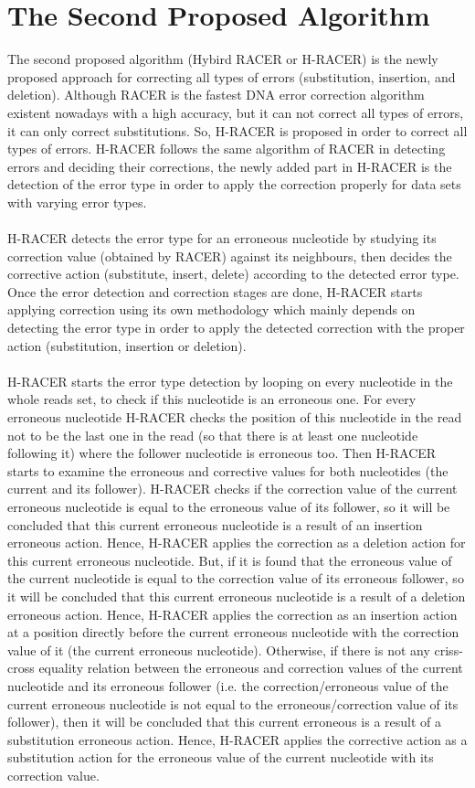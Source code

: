 \documentclass[12pt]{llncs}
\begin{document}
\newpage
\chapter{\label{chap:5}The Second Proposed Algorithm}
The second proposed algorithm (Hybird RACER or H-RACER) is the newly proposed approach for correcting all types of errors (substitution, insertion, and deletion). Although RACER is the fastest DNA error correction algorithm existent nowadays with a high accuracy, but it can not correct all types of errors, it can only correct substitutions. So, H-RACER is proposed in order to correct all types of errors. H-RACER follows the same algorithm of RACER in detecting errors and deciding their corrections, the newly added part in H-RACER is the detection of the error type in order to apply the correction properly for data sets with varying error types.
\\
\\
H-RACER detects the error type for an erroneous nucleotide by studying its correction value (obtained by RACER) against its neighbours, then decides the corrective action (substitute, insert, delete) according to the detected error type.
Once the error detection and correction stages are done, H-RACER starts applying correction using its own methodology which mainly depends on detecting the error type in order to apply the detected correction with the proper action (substitution, insertion or deletion).
\\
\\
H-RACER starts the error type detection by looping on every nucleotide in the whole reads set, to check if this nucleotide is an erroneous one. For every erroneous nucleotide H-RACER checks the position of this nucleotide in the read not to be the last one in the read (so that there is at least one nucleotide following it) where the follower nucleotide is erroneous too. Then H-RACER starts to examine the erroneous and corrective values for both nucleotides (the current and its follower). H-RACER checks if the correction value of the current erroneous nucleotide is equal to the erroneous value of its follower, so it will be concluded that this current erroneous nucleotide is a result of an insertion erroneous action. Hence, H-RACER applies the correction as a deletion action for this current erroneous nucleotide. But, if it is found that the erroneous value of the current nucleotide is equal to the correction value of its erroneous follower, so it will be concluded that this current erroneous nucleotide is a result of a deletion erroneous action. Hence, H-RACER applies the correction as an insertion action at a position directly before the current erroneous nucleotide with the correction value of it (the current erroneous nucleotide). Otherwise, if there is not any criss-cross equality relation between the erroneous and correction values of the current nucleotide and its erroneous follower (i.e. the correction/erroneous value of the current erroneous nucleotide is not equal to the erroneous/correction value of its follower), then it will be concluded that this current erroneous is a result of a substitution erroneous action. Hence, H-RACER applies the corrective action as a substitution action for the erroneous value of the current nucleotide with its correction value.
\end{document}
